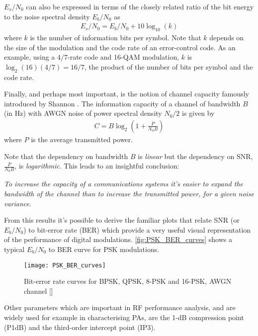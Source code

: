$E_s/N_0$ can also be expressed in terms of the closely related ratio of the bit energy to the noise spectral density $E_b/N_0$ as
\begin{align}
  \label{eq:esn0}
  E_s/N_0 = E_b/N_0 + 10\log_{10}(k)
\end{align}
where $k$ is the number of information bits per symbol. Note that $k$ depends on the size of the modulation and the code rate of an error-control code. As an example, using a $4/7$-rate code and 16-QAM modulation, $k$ is $\log_2(16) (4/7) = 16/7$, the product of the number of bits per symbol and the code rate.

Finally, and perhaps most important, is the notion of channel capacity famously introduced by Shannon \cite{shannon_capacity}. The information capacity of a channel of bandwidth $B$ (in Hz) with AWGN noise of power spectral density $N_0/2$ is given by
\begin{align}
  C = B\log_{2}\left(1+\frac{P}{N_0 B}\right)
\end{align}
where $P$ is the average transmitted power.

Note that the dependency on bandwidth $B$ is \emph{linear} but the dependency on SNR, $\frac{P}{N_0 B}$, is \emph{logarithmic}. This leads to an insightful conclusion:

\begin{displayquote}
  \emph{To increase the capacity of a communications systems it's easier to expand the bandwidth of the channel than to increase the transmitted power, for a given noise variance}.
\end{displayquote}

From this results it's possible to derive the familiar plots that relate SNR (or $E_b/N_0$) to bit-error rate (BER) which provide a very useful visual representation of the performance of digital modulations. \autoref{fig:PSK_BER_curves} shows a typical $E_b/N_0$ to BER curve for PSK modulations.

\begin{figure}[ht]
  \centering
  \texttt{[image: PSK\_BER\_curves]}
  \caption{Bit-error rate curves for BPSK, QPSK, 8-PSK and 16-PSK, AWGN channel [\citeauthor{image:ber_curve}]}
  \label{fig:PSK_BER_curves}
\end{figure}

Other parameters which are important in RF performance analysis, and are widely used for example in characterising PAs, are the 1-dB compression point (P1dB) and the third-order intercept point (IP3).

